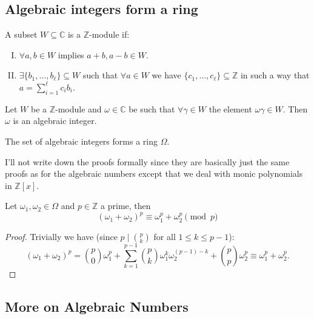 \subsection{Algebraic integers form a ring}


\begin{definition}
    A subset \(W \subseteq \mathbb{C}\) is a \(\mathbb{Z}\)-module if:
    \begin{enumerate}[I.]
        \item \(\forall a, b \in W\) implies \(a + b, a - b \in W\).
        \item \(\exists \{b_1, \dots, b_\ell\} \subseteq W\) such that \(\forall a
              \in W\) we have \(\{c_1, \dots, c_{\ell}\} \subseteq \mathbb{Z} \) in
              such a way that \(a = \sum_{i = 1}^\ell c_i b_i\).
    \end{enumerate}
\end{definition}

\begin{proposition}
    Let \(W\) be a \(\mathbb{Z}\)-module and \(\omega \in \mathbb{C}\) be such
    that \(\forall \gamma \in W\) the element \(\omega\gamma \in W\). Then
    \(\omega\) is an algebraic integer.
\end{proposition}

\begin{proposition}
    The set of algebraic integers forms a ring \(\Omega\).
\end{proposition}

I'll not write down the proofs formally since they are basically just the same
proofs as for the algebraic numbers except that we deal with monic polynomials
in \(\mathbb{Z}[x]\).

\begin{proposition}
    Let \(\omega_1, \omega_2 \in \Omega\) and \(p \in \mathbb{Z}\) a prime, then
    \[
        (\omega_1 + \omega_2)^p \equiv \omega_1^p + \omega_2^p \pmod{p}
    \]
\end{proposition}

\begin{proof}
    Trivially we have (since \(p \mid \binom{p}{k}\) for all \(1 \leqslant k
    \leqslant p-1\)):
    \[
        (\omega_1 + \omega_2)^p = \binom{p}{0} \omega_1^p + \sum_{k=1}^{p-1}
        \binom{p}{k} \omega_1^{k}\omega_2^{(p-1)-k} + \binom{p}{p} \omega_2^p
        \equiv \omega_1^p + \omega_2^p.
    \]
\end{proof}

\subsection{More on Algebraic Numbers}

